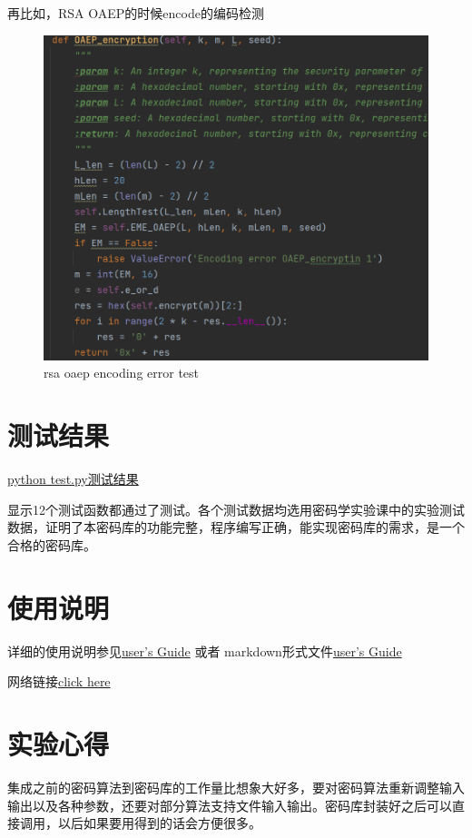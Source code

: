 \documentclass{article}
\begin{document}
\begin{sloppypar}
	再比如，RSA OAEP的时候encode的编码检测
	\begin{figure}[H]
		\centering
		\includegraphics[scale=0.8]{pic/RSA OAEP encoding error.png}
		\caption{rsa oaep encoding error test}
		\label{figure}
		
	\end{figure}
	
	\section{测试结果}
	\href{run:../test result -.html}{python test.py测试结果}
	
	显示12个测试函数都通过了测试。各个测试数据均选用密码学实验课中的实验测试数据，证明了本密码库的功能完整，程序编写正确，能实现密码库的需求，是一个合格的密码库。
	\section{使用说明}
	详细的使用说明参见\href{../user's Guide.pdf}{user's Guide} 或者 markdown形式文件\href{../user's Guide.md}{user's Guide}
	
	网络链接\href{https://github.com/wmzb1211/BUAA_Crypto_Lab_Final_Project/blob/main/crypto%20lab%20final%20project/user's%20Guide.pdf}{click here}
	\section{实验心得}
	集成之前的密码算法到密码库的工作量比想象大好多，要对密码算法重新调整输入输出以及各种参数，还要对部分算法支持文件输入输出。密码库封装好之后可以直接调用，以后如果要用得到的话会方便很多。
	
\end{sloppypar}
\end{document}
